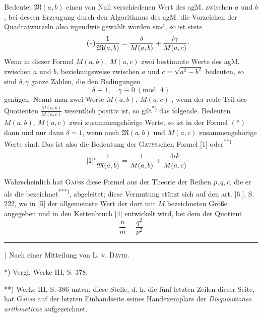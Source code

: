 \par\indent Bedeutet $\mathfrak M(a,b)$ einen  von Null verschiedenen Wert des agM. zwischen $a$ und $b$, bei dessen Erzeugung durch den Algorithmus des agM. die Vorzeichen der Quadratwurzeln also irgendwie gewählt worden sind, so ist stets
\begin{equation*}\tag*{$(\ast)$}\frac1{\mathfrak M(a,b)}=\frac\delta{M(a,b)}+\frac{i\gamma}{M(a,c)}\mathpunct{\raisebox{.5ex}{.}}\end{equation*}
\noindent Wenn in dieser Formel $M(a,b),\ M(a,c)$  zwei bestimmte Werte des agM. zwischen $a$ und $b$, beziehungsweise zwischen $a$ und $c=\sqrt{a^2-b^2}$ bedeuten, so sind $\delta,\gamma$ ganze Zahlen, die den Bedingungen
\[\delta\equiv1,\quad\gamma\equiv0\ (\text{mod. }4)\]
\noindent genügen. Nennt man zwei Werte $M(a,b),\ M(a,c)$ , wenn der reale Teil des Quotienten $\frac{M(a,b)}{M(a,c)}$ wesentlich positiv ist, so gilt\textsuperscript{*)} das folgende. Bedeuten $M(a,b),\ M(a,c)$ zwei zusammengehörige Werte, so ist in der Formel $(\ast)$ dann und nur dann $\delta=1$, wenn auch $\mathfrak M(a,b)$ und $M(a,c)$ zusammengehörige Werte sind. Das ist also die Bedeutung der \textsc{Gauss}schen Formel [1] oder\textsuperscript{**)}
\begin{equation*}\tag*{$[1]'$}\frac1{\mathfrak M(a,b)}=\frac1{M(a,b)}+\frac{4ik}{M(a,c)}\mathpunct{\raisebox{.5ex}{.}}\end{equation*}
\par\indent Wahrscheinlich hat \textsc{Gauss} diese Formel aus der Theorie der Reihen $p,q,r$, die er als die  bezeichnet\textsuperscript{***)}, abgeleitet; diese Vermutung stützt sich auf den art. [6.], S. 222, wo in [5] der allgemeinste Wert der dort mit $M$ bezeichneten Größe angegeben und in den Kettenbruch [4] entwickelt wird, bei dem der Quotient
\[\frac nm=\frac{q^2}{p^2}\]
\par\smallskip\noindent\rule{.25\linewidth}{.4pt}\par
{\small
\par\indent *) Nach einer Mitteilung von L. v. \textsc{Dávid}.
\par\indent **) Vergl. Werke III, S. 378.
\par\indent ***) Werke III, S. 386 unten; diese Stelle, d. h. die fünf letzten Zeilen dieser Seite, hat \textsc{Gauss} auf der letzten Einbandseite seines Handexemplars der \textit{Disquisitiones arithmeticae} aufgezeichnet.
\par}
